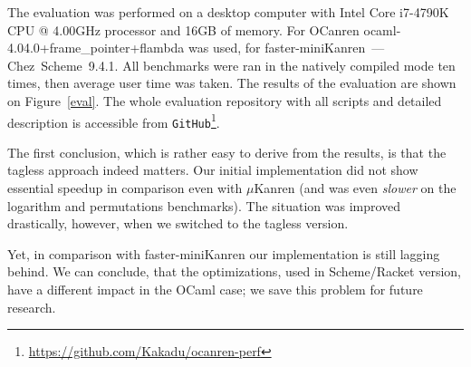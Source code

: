 
The evaluation was performed on a desktop computer with Intel Core i7-4790K CPU @ 4.00GHz processor and 16GB of memory.
For OCanren \mbox{ocaml-4.04.0+frame_pointer+flambda} was used, for faster-miniKanren~--- Chez~Scheme~9.4.1.
All benchmarks were ran in the natively compiled mode ten times, then average user time was taken. The results of the evaluation
are shown on Figure~\ref{eval}. The whole evaluation repository with all scripts and detailed description is accessible 
from \lstinline{GitHub}\footnote{\url{https://github.com/Kakadu/ocanren-perf}}.

The first conclusion, which is rather easy to derive from the results, is that the tagless approach indeed matters. Our initial
implementation did not show essential speedup in comparison even with $\mu$Kanren (and was even \emph{slower} on the logarithm
and permutations benchmarks). The situation was improved drastically, however, when we switched to the tagless version.

Yet, in comparison with faster-miniKanren our implementation is still lagging behind. We can conclude, that the optimizations, 
used in Scheme/Racket version, have a different impact in the OCaml case; we save this problem for future research.

